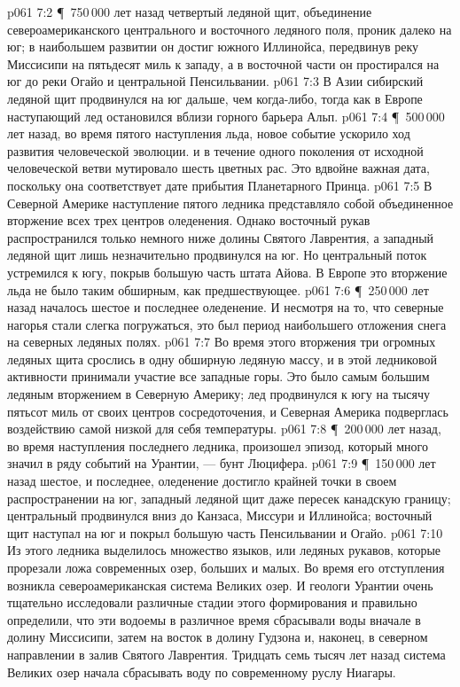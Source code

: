 \vs p061 7:2 \P\ 750\,000 лет назад четвертый ледяной щит, объединение североамериканского центрального и восточного ледяного поля, проник далеко на юг; в наибольшем развитии он достиг южного Иллинойса, передвинув реку Миссисипи на пятьдесят миль к западу, а в восточной части он простирался на юг до реки Огайо и центральной Пенсильвании.
\vs p061 7:3 В Азии сибирский ледяной щит продвинулся на юг дальше, чем когда\hyp{}либо, тогда как в Европе наступающий лед остановился вблизи горного барьера Альп.
\vs p061 7:4 \P\ 500\,000 лет назад, во время пятого наступления льда, новое событие ускорило ход развития человеческой эволюции.  и в течение одного поколения от исходной человеческой ветви мутировало шесть цветных рас. Это вдвойне важная дата, поскольку она соответствует дате прибытия Планетарного Принца.
\vs p061 7:5 В Северной Америке наступление пятого ледника представляло собой объединенное вторжение всех трех центров оледенения. Однако восточный рукав распространился только немного ниже долины Святого Лаврентия, а западный ледяной щит лишь незначительно продвинулся на юг. Но центральный поток устремился к югу, покрыв большую часть штата Айова. В Европе это вторжение льда не было таким обширным, как предшествующее.
\vs p061 7:6 \P\ 250\,000 лет назад началось шестое и последнее оледенение. И несмотря на то, что северные нагорья стали слегка погружаться, это был период наибольшего отложения снега на северных ледяных полях.
\vs p061 7:7 Во время этого вторжения три огромных ледяных щита срослись в одну обширную ледяную массу, и в этой ледниковой активности принимали участие все западные горы. Это было самым большим ледяным вторжением в Северную Америку; лед продвинулся к югу на тысячу пятьсот миль от своих центров сосредоточения, и Северная Америка подверглась воздействию самой низкой для себя температуры.
\vs p061 7:8 \P\ 200\,000 лет назад, во время наступления последнего ледника, произошел эпизод, который много значил в ряду событий на Урантии, --- бунт Люцифера.
\vs p061 7:9 \P\ 150\,000 лет назад шестое, и последнее, оледенение достигло крайней точки в своем распространении на юг, западный ледяной щит даже пересек канадскую границу; центральный продвинулся вниз до Канзаса, Миссури и Иллинойса; восточный щит наступал на юг и покрыл большую часть Пенсильвании и Огайо.
\vs p061 7:10 Из этого ледника выделилось множество языков, или ледяных рукавов, которые прорезали ложа современных озер, больших и малых. Во время его отступления возникла североамериканская система Великих озер. И геологи Урантии очень тщательно исследовали различные стадии этого формирования и правильно определили, что эти водоемы в различное время сбрасывали воды вначале в долину Миссисипи, затем на восток в долину Гудзона и, наконец, в северном направлении в залив Святого Лаврентия. Тридцать семь тысяч лет назад система Великих озер начала сбрасывать воду по современному руслу Ниагары.
